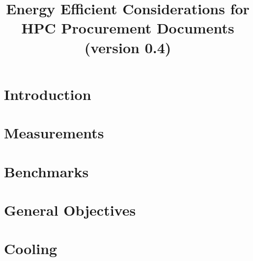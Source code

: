 \documentclass[runningheads,parskip=full]{scrreprt}
\begin{document}
\pagestyle{headings}  %

\title{
Energy Efficient Considerations for HPC Procurement Documents \\
\bigskip
\normalsize{(version 0.4)}
}


\date{ }
\maketitle              %

\tableofcontents
\listoftables
\listoffigures

%
\chapter{Introduction}

\label{sec:intro}

\chapter{Measurements}

\label{sec:measurements}

\chapter{Benchmarks}

\label{sec:benchmarks}

\chapter{General Objectives}

\label{sec:genobjectives}

\chapter{Cooling}

\label{sec:cooling}
\end{document}
